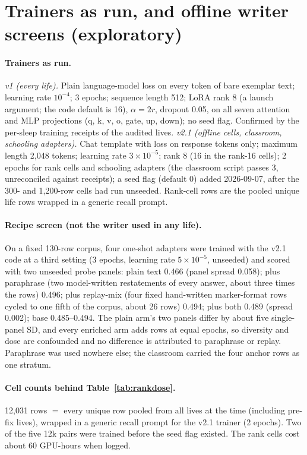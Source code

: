 \documentclass{article}
\begin{document}
\section{Trainers as run, and offline writer screens (exploratory)}
\label{app:writer}

\paragraph{Trainers as run.} \emph{v1 (every life).} Plain language-model loss on every token of bare exemplar text; learning rate $10^{-4}$; 3 epochs; sequence length 512; LoRA rank 8 (a launch argument; the code default is 16), $\alpha = 2r$, dropout 0.05, on all seven attention and MLP projections (q, k, v, o, gate, up, down); no seed flag. Confirmed by the per-sleep training receipts of the audited lives. \emph{v2.1 (offline cells, classroom, schooling adapters).} Chat template with loss on response tokens only; maximum length 2{,}048 tokens; learning rate $3\times10^{-5}$; rank 8 (16 in the rank-16 cells); 2 epochs for rank cells and schooling adapters (the classroom script passes 3, unreconciled against receipts); a seed flag (default 0) added 2026-09-07, after the 300- and 1{,}200-row cells had run unseeded. Rank-cell rows are the pooled unique life rows wrapped in a generic recall prompt.

\paragraph{Recipe screen (not the writer used in any life).} On a fixed 130-row corpus, four one-shot adapters were trained with the v2.1 code at a third setting (3 epochs, learning rate $5\times10^{-5}$, unseeded) and scored with two unseeded probe panels: plain text 0.466 (panel spread 0.058); plus paraphrase (two model-written restatements of every answer, about three times the rows) 0.496; plus replay-mix (four fixed hand-written marker-format rows cycled to one fifth of the corpus, about 26 rows) 0.494; plus both 0.489 (spread 0.002); base 0.485--0.494. The plain arm's two panels differ by about five single-panel SD, and every enriched arm adds rows at equal epochs, so diversity and dose are confounded and no difference is attributed to paraphrase or replay. Paraphrase was used nowhere else; the classroom carried the four anchor rows as one stratum.

\paragraph{Cell counts behind Table~\ref{tab:rankdose}.} 12{,}031 rows $=$ every unique row pooled from all lives at the time (including pre-fix lives), wrapped in a generic recall prompt for the v2.1 trainer (2 epochs). Two of the five 12k pairs were trained before the seed flag existed. The rank cells cost about 60 GPU-hours when logged.
\end{document}
